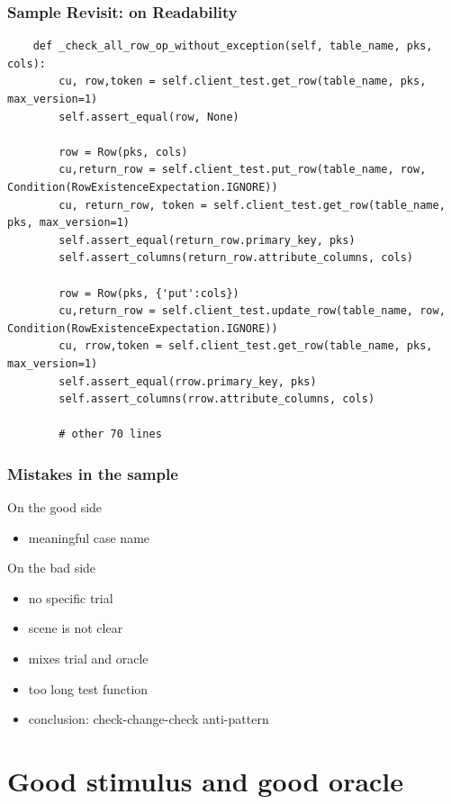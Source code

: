 \documentclass[lualatex]{beamer}
\begin{document}
\begin{frame}[fragile]
  \frametitle{Sample Revisit: on Readability}

  \begin{verbatim}
    def _check_all_row_op_without_exception(self, table_name, pks, cols):
        cu, row,token = self.client_test.get_row(table_name, pks, max_version=1)
        self.assert_equal(row, None)
        
        row = Row(pks, cols)
        cu,return_row = self.client_test.put_row(table_name, row, Condition(RowExistenceExpectation.IGNORE))
        cu, return_row, token = self.client_test.get_row(table_name, pks, max_version=1)
        self.assert_equal(return_row.primary_key, pks)
        self.assert_columns(return_row.attribute_columns, cols)

        row = Row(pks, {'put':cols})
        cu,return_row = self.client_test.update_row(table_name, row, Condition(RowExistenceExpectation.IGNORE))
        cu, rrow,token = self.client_test.get_row(table_name, pks, max_version=1)
        self.assert_equal(rrow.primary_key, pks)
        self.assert_columns(rrow.attribute_columns, cols)

        # other 70 lines
  \end{verbatim}
\end{frame}

\begin{frame}
  \frametitle{Mistakes in the sample}

  \begin{block}{On the good side}
    \begin{itemize}
    \item meaningful case name
    \end{itemize}
  \end{block}
  \begin{block}{On the bad side}
    \begin{itemize}
    \item no specific trial
    \item scene is not clear
    \item mixes trial and oracle
    \item too long test function
    \item conclusion: check-change-check anti-pattern
    \end{itemize}
  \end{block}
\end{frame}

\section{Good stimulus and good oracle}
\end{document}
